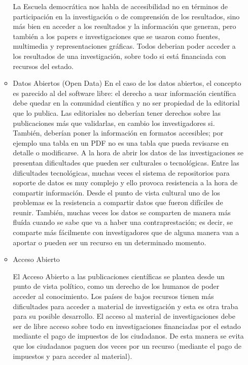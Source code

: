 \begin{itemize}
\begin{itemize}
		La Escuela democrática nos habla de accesibilidad no en términos de participación en la investigación o de comprensión de los resultados, sino más bien en acceder a los resultados y la información que generan, pero también a los papers e investigaciones que se usaron como fuentes, multimedia y representaciones gráficas. Todos deberian poder acceder a los resultados de una investigación, sobre todo si está financiada con recursos del estado.
		\item{Datos Abiertos (Open Data)}
		En el caso de los datos abiertos, el concepto es parecido al del software libre: el derecho a usar información científica debe quedar en la comunidad científica y no ser propiedad de la editorial que lo publica. Las editoriales no deberían tener derechos sobre las publicaciones más que validarlas, en cambio los investigadores si. También, deberían poner la información en formatos accesibles; por ejemplo una tabla en un PDF no es una tabla que pueda revisarse en detalle o modificarse. A la hora de abrir los datos de las investigaciones se presentan dificultades que pueden ser culturales o tecnológicas. Entre las dificultades tecnológicas, muchas veces el sistema de repositorios para soporte de datos es muy complejo y ello provoca resistencia a la hora de compartir información. Desde el punto de vista cultural uno de los problemas es la resistencia a compartir datos que fueron difíciles de reunir. También, muchas veces los datos se comparten de manera más fluída cuando se sabe que va a haber una contraprestación; es decir, se comparte más fácilmente con investigadores que de alguna manera van a aportar o pueden ser un recurso en un determinado momento.
		
		\item{Acceso Abierto}
		
		El Acceso Abierto a las publicaciones científicas se plantea desde un punto de vista político, como un derecho de los humanos de poder acceder al conocimiento. Los países de bajos recursos tienen más dificultades para acceder a material de investigación y esta es otra traba para su posible desarrollo. El acceso al material de investigaciones debe ser de libre acceso sobre todo en investigaciones financiadas por el estado mediante el pago de impuestos de los ciudadanos. De esta manera se evita que los ciudadanos paguen dos veces por un recurso (mediante el pago de impuestos y para acceder al material).
		

\end{itemize}
\end{itemize}
